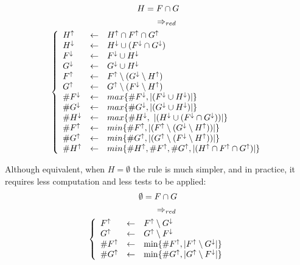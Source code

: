 \documentclass[3p,authoryear,times]{elsarticle}
\newcommand{\card}[1]{|#1|}
\newcommand{\MS}[1]{{{#1}^{\uparrow}}}
\newcommand{\ms}[1]{{\MakeUppercase{#1}^\downarrow}}
\newcommand{\MSF}[0]{\MS{F}}
\newcommand{\msF}[0]{\ms{f}}
\newcommand{\MSG}[0]{\MS{G}}
\newcommand{\msG}[0]{\ms{g}}
\newcommand{\MSH}[0]{\MS{H}}
\newcommand{\msH}[0]{\ms{h}}
\newcommand{\MC}[1]{{\#{#1}^\uparrow{}}}
\newcommand{\mc}[1]{{\#{#1}^\downarrow}}
\newcommand{\MCF}[0]{\MC{F}{}}
\newcommand{\mcF}[0]{\mc{F}{}}
\newcommand{\MCG}[0]{\MC{G}}
\newcommand{\mcG}[0]{\mc{G}}
\newcommand{\MCH}[0]{\MC{H}}
\newcommand{\mcH}[0]{\mc{H}}
\newcommand{\C}[1]{\card{#1}}
\newcommand{\rmin}[0]{{\Rightarrow_{red}}}
\newcommand{\la}[0]{\leftarrow}
\begin{document}
\begin{gather} 
H=F \cap G \nonumber\\
~~~~~~ \rmin  \label{rint}\\
\begin{array}{l}
     \left\lbrace
     \begin{array}{lll}
     	\MSH & \la & \MSH \cap \MSF \cap \MSG  \\
     	\msH & \la & \msH \cup (\msF \cap \msG)\\
	\msF & \la & \msF \cup \msH\\
	\msG & \la & \msG \cup \msH\\
           \MSF & \la & \MSF \setminus (\msG \setminus \MSH)\\
           \MSG & \la & \MSG \setminus (\msF \setminus \MSH)\\
           \mcF & \la &  max\{ \mcF, \C{(\msF \cup \msH)}\}\\
           \mcG & \la &  max\{ \mcG,\C{(\msG \cup \msH)}\}\\
           \mcH & \la &  max\{\mcH,~\C{(\msH \cup (\msF \cap \msG))}\}\\
           \MCF & \la &   min\{\MCF, \C{(\MSF \setminus (\msG \setminus \MSH))}\} \\
           \MCG & \la &  min\{\MCG, \C{(\MSG \setminus (\msF \setminus \MSH))}\} \\
           \MCH & \la &   min\{\MCH, \MCF, \MCG, \C{(\MSH \cap \MSF \cap \MSG)} \}
     \end{array} 
     \right. 
\end{array} \nonumber
\end{gather}





Although equivalent,  when $H=\emptyset$ the rule is much simpler, and in practice, it requires less computation and less tests to be applied:
\begin{gather} 
\emptyset=F \cap G \nonumber \\
~~~~~~ \rmin \label{rint2} \\
\begin{array}{l}
     \left\lbrace
     \begin{array}{lll}
           \MSF& \la & \MSF \setminus \msG \\
           \MSG& \la & \MSG \setminus \msF\\
           \MCF& \la &   \min\{\MCF, \C{\MSF \setminus \msG}\} \\
           \MCG& \la &  \min\{\MCG, \C{\MSG \setminus \msF}\} \\
     \end{array}
     \right. 
\end{array}\nonumber
\end{gather}
\end{document}
